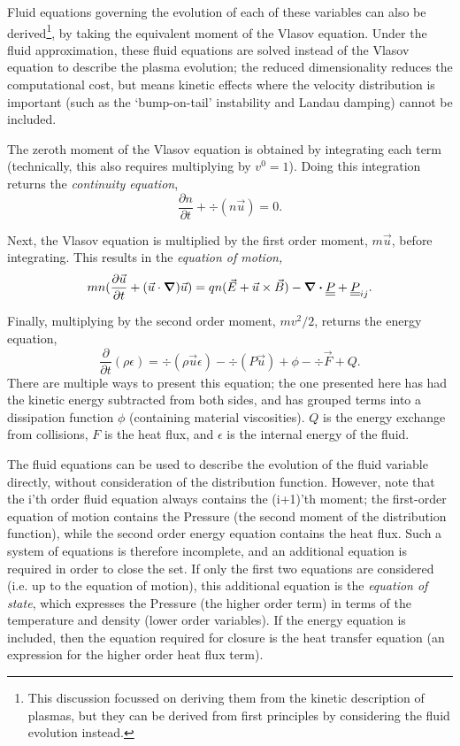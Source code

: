 Fluid equations governing the evolution of each of these variables can also be derived\footnote{This discussion focussed on deriving them from the kinetic description of plasmas, but they can be derived from first principles by considering the fluid evolution instead.}, by taking the equivalent moment of the Vlasov equation. Under the fluid approximation, these fluid equations are solved instead of the Vlasov equation to describe the plasma evolution; the reduced dimensionality reduces the computational cost, but means kinetic effects where the velocity distribution is important (such as the `bump-on-tail' instability and Landau damping) cannot be included.

The zeroth moment of the Vlasov equation is obtained by integrating each term (technically, this also requires multiplying by $v^0 = 1$). Doing this integration returns the \textit{continuity equation},
\begin{equation} \frac{\partial n}{\partial t} + \div (n \vec{u}) = 0. \end{equation}

Next, the Vlasov equation is multiplied by the first order moment, $m\vec{u}$, before integrating. This results in the \textit{equation of motion,}
\begin{equation} mn(\frac{\partial \vec{u}}{\partial t} + (\vec{u} \cdot \grad)\vec{u}) = qn(\vec{E} + \vec{u} \times \vec{B}) - \div \underline{\underline{P}} + \underline{\underline{P}}_{ij} .\end{equation}

Finally, multiplying by the second order moment, $mv^2 / 2$, returns the energy equation,
\begin{equation} \frac{ \partial}{\partial t} (\rho \epsilon) = \div (\rho \vec{u} \epsilon) - \div (P \vec{u}) + \phi - \div \vec{F} + Q. \label{eqn: Energy equation} \end{equation}
There are multiple ways to present this equation; the one presented here has had the kinetic energy subtracted from both sides, and has grouped terms into a dissipation function $\phi$ (containing material viscosities). $Q$ is the energy exchange from collisions, $F$ is the heat flux, and $\epsilon$ is the internal energy of the fluid.

The fluid equations can be used to describe the evolution of the fluid variable directly, without consideration of the distribution function. However, note that the i'th order fluid equation always contains the (i+1)'th moment; the first-order equation of motion contains the Pressure (the second moment of the distribution function), while the second order energy equation contains the heat flux. Such a system of equations is therefore incomplete, and an additional equation is required in order to close the set. If only the first two equations are considered (i.e. up to the equation of motion), this additional equation is the \textit{equation of state}, which expresses the Pressure (the higher order term) in terms of the temperature and density (lower order variables). If the energy equation is included, then the equation required for closure is the heat transfer equation (an expression for the higher order heat flux term).

